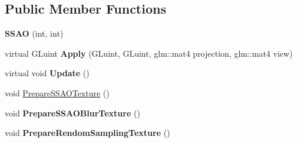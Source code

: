 \subsection*{Public Member Functions}
\begin{DoxyCompactItemize}
\item 
{\bfseries S\+S\+AO} (int, int)\hypertarget{class_post_process_1_1_s_s_a_o_ae3cd695ae516c1774352fa3bb0156ac3}{}\label{class_post_process_1_1_s_s_a_o_ae3cd695ae516c1774352fa3bb0156ac3}

\item 
virtual G\+Luint {\bfseries Apply} (G\+Luint, G\+Luint, glm\+::mat4 projection, glm\+::mat4 view)\hypertarget{class_post_process_1_1_s_s_a_o_af58c2b45ab566e883be59ca70e1387aa}{}\label{class_post_process_1_1_s_s_a_o_af58c2b45ab566e883be59ca70e1387aa}

\item 
virtual void {\bfseries Update} ()\hypertarget{class_post_process_1_1_s_s_a_o_a508263f5a3cc0f76c36da322d034afbc}{}\label{class_post_process_1_1_s_s_a_o_a508263f5a3cc0f76c36da322d034afbc}

\item 
void \hyperlink{class_post_process_1_1_s_s_a_o_ae98498534b2c0f6d064979e2b9e1cc5d}{Prepare\+S\+S\+A\+O\+Texture} ()
\item 
void {\bfseries Prepare\+S\+S\+A\+O\+Blur\+Texture} ()\hypertarget{class_post_process_1_1_s_s_a_o_ae8b281937c146c92b8bc3aad69991e95}{}\label{class_post_process_1_1_s_s_a_o_ae8b281937c146c92b8bc3aad69991e95}

\item 
void {\bfseries Prepare\+Rendom\+Sampling\+Texture} ()\hypertarget{class_post_process_1_1_s_s_a_o_a05dc8ab916683793d0cd9603d6364353}{}\label{class_post_process_1_1_s_s_a_o_a05dc8ab916683793d0cd9603d6364353}

\end{DoxyCompactItemize}
